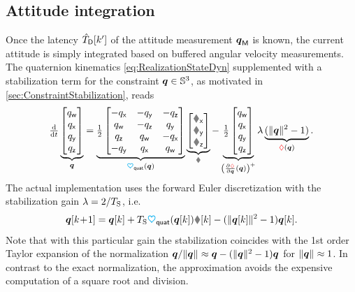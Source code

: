 \subsection{Attitude integration}
Once the latency $\hat{T}_{\mathsf{D}}[k']$ of the attitude measurement $\boldsymbol{q}_{\mathsf{M}}$ is known, the current attitude is simply integrated based on buffered angular velocity measurements.
The quaternion kinematics \eqref{eq:RealizationStateDyn} supplemented with a stabilization term for the constraint $\boldsymbol{q} \in \mathbb{S}^3$, as motivated in \autoref{sec:ConstraintStabilization}, reads
\begin{align}\label{eq:QuaternionKinematics}
 \tdiff{t} \underbrace{\begin{bmatrix} \quatw \\ \quatx \\ \quaty \\ \quatz \end{bmatrix}}_{\quat}
 = \underbrace{\tfrac{1}{2} \begin{bmatrix} -\quatx & -\quaty & -\quatz \\ \quatw & -\quatz & \quaty \\ \quatz & \quatw & -\quatx \\ -\quaty & \quatx & \quatw \end{bmatrix}}_{\kinMatQuat(\quat)}
 \underbrace{\begin{bmatrix} \wx \\ \wy \\ \wz \end{bmatrix}}_{\w}
 -
 \underbrace{\tfrac{1}{2} \begin{bmatrix} \quatw \\ \quatx \\ \quaty \\ \quatz \end{bmatrix}}_{\left(\pdiff[\geoConstraint]{\quat}(\quat)\right)^+}
 \lambda\underbrace{(\norm{\quat}^2 - 1)}_{\geoConstraint(\quat)}
 .
\end{align}
The actual implementation uses the forward Euler discretization with the stabilization gain $\lambda=2 / T_{\mathrm{S}}$, i.e.\
\begin{align}\label{eq:QuaternionKinematicsDiscrete}
 \quat[k\!+\!1] = \quat[k] + \Ts \kinMatQuat(\quat[k]) \w[k] - (\norm{\quat[k]}^2-1) \quat[k].
\end{align}
Note that with this particular gain the stabilization coincides with the 1st order Taylor expansion of the normalization $\boldsymbol{q} / \| \boldsymbol{q} \|_{} \approx \boldsymbol{q} - (\| \boldsymbol{q} \|_{}^2-1) \boldsymbol{q}$ for $\| \boldsymbol{q} \|_{} \approx 1$.
In contrast to the exact normalization, the approximation avoids the expensive computation of a square root and division.

